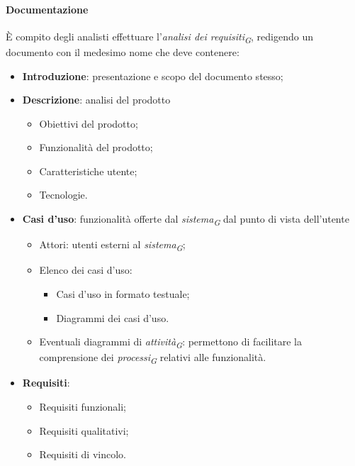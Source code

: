 \paragraph{Documentazione}
È compito degli analisti effettuare l'\textit{analisi dei requisiti}\textsubscript{\textit{G}}, redigendo un documento con il medesimo nome che deve contenere:
\begin{itemize}
    \item \textbf{Introduzione}: presentazione e scopo del documento stesso;
    \item \textbf{Descrizione}: analisi del prodotto
        \begin{itemize}
            \item Obiettivi del prodotto;
            \item Funzionalità del prodotto;
            \item Caratteristiche utente;
            \item Tecnologie.
        \end{itemize}
    
    \pagebreak
    \item \textbf{Casi d'uso}: funzionalità offerte dal \textit{sistema}\textsubscript{\textit{G}} dal punto di vista dell'utente
        \begin{itemize}
            \item Attori: utenti esterni al \textit{sistema}\textsubscript{\textit{G}};
            \item Elenco dei casi d'uso:
            \begin{itemize}
                \item Casi d'uso in formato testuale;
                \item Diagrammi dei casi d'uso.
            \end{itemize}  
            \item Eventuali diagrammi di \textit{attività}\textsubscript{\textit{G}}: permettono di facilitare la comprensione dei \textit{processi}\textsubscript{\textit{G}} relativi alle funzionalità.
        \end{itemize}
    \item \textbf{Requisiti}:
        \begin{itemize}
            \item Requisiti funzionali;
            \item Requisiti qualitativi;
            \item Requisiti di vincolo.
        \end{itemize}
\end{itemize}
